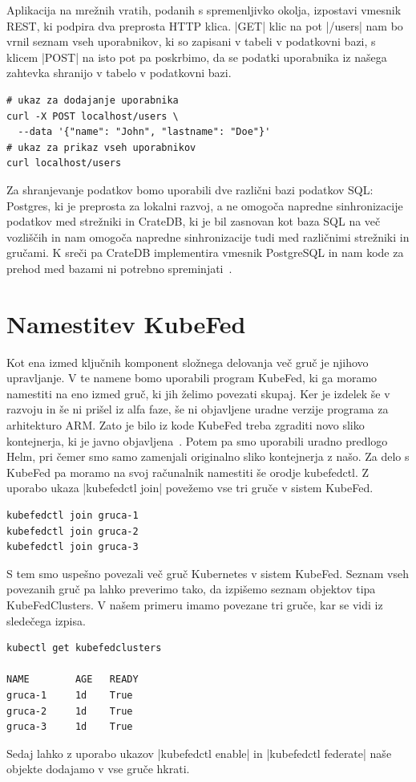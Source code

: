 \documentclass[a4paper, 12pt]{book}
\begin{document}
Aplikacija na mrežnih vratih, podanih s spremenljivko okolja, izpostavi vmesnik REST, ki podpira dva preprosta HTTP klica.
\spverb|GET| klic na pot \spverb|/users| nam bo vrnil seznam vseh uporabnikov, ki so zapisani v tabeli v podatkovni bazi, s klicem \spverb|POST| na isto pot pa poskrbimo, da se podatki uporabnika iz našega zahtevka shranijo v tabelo v podatkovni bazi.
\begin{verbatim}
# ukaz za dodajanje uporabnika
curl -X POST localhost/users \
  --data '{"name": "John", "lastname": "Doe"}'
# ukaz za prikaz vseh uporabnikov
curl localhost/users
\end{verbatim}

Za shranjevanje podatkov bomo uporabili dve različni bazi podatkov SQL: Postgres, ki je preprosta za lokalni razvoj, a ne omogoča napredne sinhronizacije podatkov med strežniki in CrateDB, ki je bil zasnovan kot baza SQL na več vozliščih in nam omogoča napredne sinhronizacije tudi med različnimi strežniki in gručami.
K sreči pa CrateDB implementira vmesnik PostgreSQL in nam kode za prehod med bazami ni potrebno spreminjati~\cite{cratedb}.
\section{Namestitev KubeFed}
Kot ena izmed ključnih komponent složnega delovanja več gruč je njihovo upravljanje.
V te namene bomo uporabili program KubeFed, ki ga moramo namestiti na eno izmed gruč, ki jih želimo povezati skupaj.
Ker je izdelek še v razvoju in še ni prišel iz alfa faze, še ni objavljene uradne verzije programa za arhitekturo ARM.
Zato je bilo iz kode KubeFed treba zgraditi novo sliko kontejnerja, ki je javno objavljena~\cite{docker-kubefed}.
Potem pa smo uporabili uradno predlogo Helm, pri čemer smo samo zamenjali originalno sliko kontejnerja z našo.
Za delo s KubeFed pa moramo na svoj računalnik namestiti še orodje kubefedctl.
Z uporabo ukaza \spverb|kubefedctl join| povežemo vse tri gruče v sistem KubeFed.
\begin{verbatim}
kubefedctl join gruca-1
kubefedctl join gruca-2
kubefedctl join gruca-3
\end{verbatim}
S tem smo uspešno povezali več gruč Kubernetes v sistem KubeFed.
Seznam vseh povezanih gruč pa lahko preverimo tako, da izpišemo seznam objektov tipa KubeFedClusters. 
V našem primeru imamo povezane tri gruče, kar se vidi iz sledečega izpisa.
\begin{verbatim}
kubectl get kubefedclusters

NAME        AGE   READY
gruca-1     1d    True
gruca-2     1d    True
gruca-3     1d    True
\end{verbatim}
Sedaj lahko z uporabo ukazov \spverb|kubefedctl enable| in \spverb|kubefedctl federate| naše objekte dodajamo v vse gruče hkrati.
\end{document}
